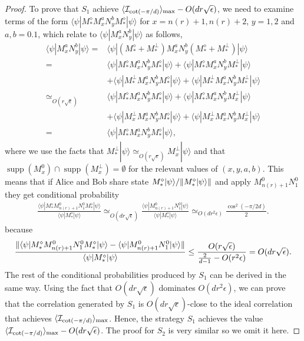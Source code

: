 \documentclass[11pt,letterpaper]{article}
\newcommand{\ket}[1]{|#1\rangle}
\newcommand{\bra}[1]{\langle#1|}
\DeclarePairedDelimiter{\norm}{\lVert}{\rVert}
\DeclarePairedDelimiter{\ip}{\langle}{\rangle}
\DeclareMathOperator{\supp}{supp}
\newcommand{\1}{\mathbb{1}}
\newcommand{\nr}{n(r)}
\newcommand{\I}{\mathcal{I}}
\newcommand{\ep}{\epsilon}
\newcommand{\se}{\sqrt{\epsilon}}
\newcommand{\appd}[1]{\simeq_{#1}}
\theoremstyle{definition}
\begin{document}
\begin{proof}
To prove that $S_1$ achieve $\ip{\I_{\cot(-\pi/d)}}_{\max} - O(d r\se)$, we need to examine terms of the form
$\bra{\psi} M_\ast^\diamond M_{x}^aN_y^b M_\ast^\diamond\ket{\psi}$ for $x = \nr+1,\nr+2$, $y=1,2$ and $a,b = 0.1$,
which relate to $\bra{\psi} M_x^a N_y^b \ket{\psi}$ as follows,
\begin{align*}
	   \bra{\psi} M_{x}^aN_y^b \ket{\psi} 
	= &\bra{\psi}(M_\ast^\diamond + M_\ast^\perp) M_x^a N_y^b (M_\ast^\diamond + M_\ast^\perp)\ket{\psi} \\
	= & \bra{\psi}M_\ast^\diamond M_x^aN_y^b M_\ast^\diamond\ket{\psi} + \bra{\psi}M_\ast^\diamond M_x^aN_y^b M_\ast^\perp\ket{\psi}\\
	&+\bra{\psi}M_\ast^\perp M_x^aN_y^b M_\ast^\diamond\ket{\psi} + \bra{\psi}M_\ast^\perp M_x^aN_y^b M_\ast^\perp\ket{\psi}\\
	\appd{O(r\se)}&  \bra{\psi}M_\ast^\diamond M_x^aN_y^b M_\ast^\diamond\ket{\psi} + \bra{\psi}M_\ast^\diamond M_x^aN_y^b M_x^\perp\ket{\psi} \\
	&+\bra{\psi}M_x^\perp M_x^aN_y^b M_\ast^\diamond\ket{\psi} + \bra{\psi}M_x^\perp M_x^aN_y^b M_x^\perp\ket{\psi}\\
	=&\bra{\psi}M_\ast^\diamond M_x^aN_y^b M_\ast^\diamond\ket{\psi},
\end{align*}
where we use the facts that $M_\ast^\perp \ket{\psi} \appd{O(r\se)} M_x^\perp \ket{\psi}$ and that 
$\supp(M_x^0) \cap \supp(M_x^\perp) = \emptyset$ for the relevant values of $(x,y,a,b)$.
This means that if Alice and Bob share state $M_\ast^\diamond \ket{\psi}/\norm{M_\ast^\diamond \ket{\psi}}$ and apply $M_{\nr+1}^0N_1^0$
they get conditional probability
\begin{align*}
	\frac{\bra{\psi}M_\ast^\diamond M_{\nr+1}^0N_1^0 M_\ast^\diamond\ket{\psi}}{\bra{\psi} M_\ast^\diamond \ket{\psi}}  
	\appd{O(d r\se)} \frac{\bra{\psi} M_{\nr+1}^0N_1^0 \ket{\psi}}{\bra{\psi} M_\ast^\diamond \ket{\psi}}
	\appd{O(d r^2 \ep)}
	\frac{\cos^2(-\pi/2d)}{2}.
\end{align*} 
because
\begin{align*}
	\frac{ \norm{\bra{\psi}M_\ast^\diamond M_{\nr+1}^0N_1^0 M_\ast^\diamond\ket{\psi} -  \bra{\psi} M_{\nr+1}^0N_1^0 \ket{\psi}}}
	{\bra{\psi} M_\ast^\diamond \ket{\psi}} \leq \frac{O(r\se)}{\frac{2}{d-1} - O(r^2 \ep)} = O(d r  \se).
\end{align*}
The rest of the conditional probabilities produced by $S_1$ can be derived in the same way.
Using the fact that $O(d r \se)$ dominates $O(dr^2 \ep)$,
we can prove that the correlation generated by $S_1$ 
is $O(dr\se)$-close to the ideal correlation that achieves $\ip{\I_{\cot(-\pi/d)}}_{\max}$.
Hence, the strategy $S_1$ achieves the value $\ip{\I_{\cot(-\pi/d)}}_{\max} - O(d r \se)$.
The proof for $S_2$ is very similar so we omit it here.
\end{proof}
\end{document}
